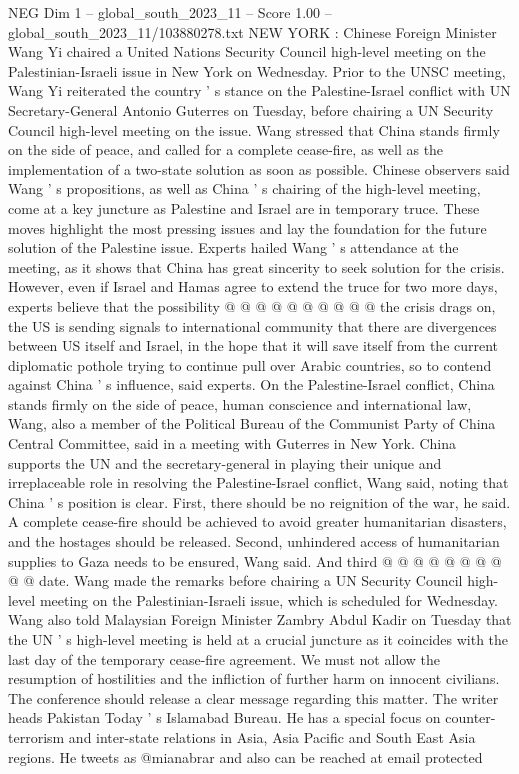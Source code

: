 \begin{textsample}{NEG Dim 1 – global\_south\_2023\_11 – Score 1.00 – global\_south\_2023\_11/103880278.txt}  \label{ex:f1_neg_228}
NEW YORK : Chinese Foreign Minister Wang Yi chaired a United Nations Security Council high-level meeting on the Palestinian-Israeli issue in New York on Wednesday.
Prior to the UNSC meeting, Wang Yi reiterated the country ' s stance on the Palestine-Israel conflict with UN Secretary-General Antonio Guterres on Tuesday, before chairing a UN Security Council high-level meeting on the issue.
Wang stressed that China stands firmly on the side of peace, and called for a complete cease-fire, as well as the implementation of a two-state solution as soon as possible.
Chinese observers said Wang ' s propositions, as well as China ' s chairing of the high-level meeting, come at a key juncture as Palestine and Israel are in temporary truce.
These moves highlight the most pressing issues and lay the foundation for the future solution of the Palestine issue.
Experts hailed Wang ' s attendance at the meeting, as it shows that China has great sincerity to seek solution for the crisis.
However, even if Israel and Hamas agree to extend the truce for two more days, experts believe that the possibility @ @ @ @ @ @ @ @ @ @ the crisis drags on, the US is sending signals to international community that there are divergences between US itself and Israel, in the hope that it will save itself from the current diplomatic pothole trying to continue pull over Arabic countries, so to contend against China ' s influence, said experts.
On the Palestine-Israel conflict, China stands firmly on the side of peace, human conscience and international law, Wang, also a member of the Political Bureau of the Communist Party of China Central Committee, said in a meeting with Guterres in New York.
China supports the UN and the secretary-general in playing their unique and irreplaceable role in resolving the Palestine-Israel conflict, Wang said, noting that China ' s position is clear.
First, there should be no reignition of the war, he said.
A complete cease-fire should be achieved to avoid greater humanitarian disasters, and the hostages should be released.
Second, unhindered access of humanitarian supplies to Gaza needs to be ensured, Wang said.
And third @ @ @ @ @ @ @ @ @ @ date.
Wang made the remarks before chairing a UN Security Council high-level meeting on the Palestinian-Israeli issue, which is scheduled for Wednesday.
Wang also told Malaysian Foreign Minister Zambry Abdul Kadir on Tuesday that the UN ' s high-level meeting is held at a crucial juncture as it coincides with the last day of the temporary cease-fire agreement.
We must not allow the resumption of hostilities and the infliction of further harm on innocent civilians.
The conference should release a clear message regarding this matter.
The writer heads Pakistan Today ' s Islamabad Bureau.
He has a special focus on counter-terrorism and inter-state relations in Asia, Asia Pacific and South East Asia regions.
He tweets as @mianabrar and also can be reached at email protected

\end{textsample}
